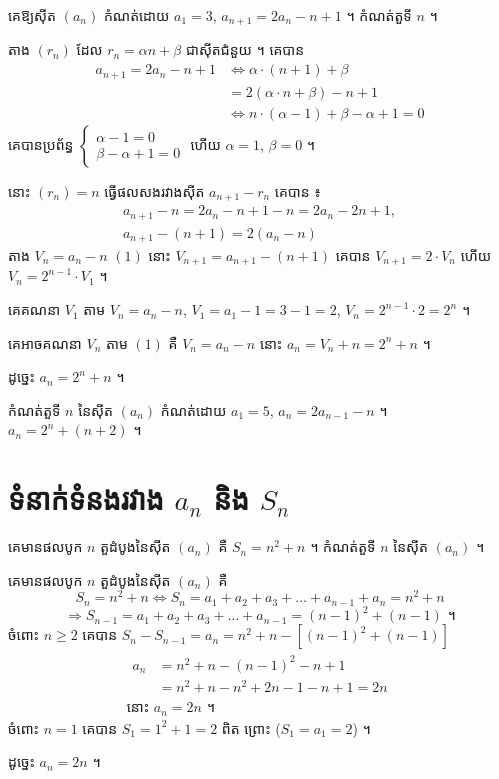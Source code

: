 \begin{example}[លំហាត់គំរូ ២]
គេឱ្យស៊ីត $(a_n)$ កំណត់ដោយ $a_1 = 3$, $a_{n+1} = 2a_n - n + 1$ ។ កំណត់តួទី $n$ ។
\end{example}
\ans
តាង $(r_n)$ ដែល $r_n = \alpha n + \beta$ ជាស៊ីតជំនួយ ។ គេបាន
\[
\begin{aligned}
a_{n+1} = 2a_n - n + 1 &\iff \alpha \cdot (n + 1) + \beta\\
&= 2(\alpha \cdot n + \beta) - n + 1\\
&\iff n \cdot (\alpha - 1) + \beta - \alpha + 1 = 0
\end{aligned}
\]
គេបានប្រព័ន្ធ $\begin{cases} \alpha - 1 = 0\\ \beta - \alpha + 1 = 0 \end{cases}$ ហើយ $\alpha = 1$, $\beta = 0$ ។

នោះ $(r_n) = n$ ធ្វើផលសងរវាងស៊ីត $a_{n+1} - r_n$ គេបាន ៖
\[
\begin{gathered}
a_{n+1} - n = 2a_n - n + 1 - n = 2a_n - 2n + 1,\\
a_{n+1} - (n + 1) = 2(a_n - n)
\end{gathered}
\]
តាង $V_n = a_n - n$ \quad $(1)$ នោះ $V_{n+1} = a_{n+1} - (n + 1)$ គេបាន $V_{n+1} = 2 \cdot V_n$ ហើយ $V_n = 2^{n-1} \cdot V_1$ ។

គេគណនា $V_1$ តាម $V_n = a_n - n$, $V_1 = a_1 - 1 = 3 - 1 = 2$, $V_n = 2^{n-1} \cdot 2 = 2^n$ ។

គេអាចគណនា $V_n$ តាម $(1)$ គឺ $V_n = a_n - n$ នោះ $a_n = V_n + n = 2^n + n$ ។

ដូច្នេះ $a_n = 2^n + n$ ។

\begin{pro}
កំណត់តួទី $n$ នៃស៊ីត $(a_n)$ កំណត់ដោយ $a_1 = 5$, $a_n = 2a_{n-1} - n$ ។
\ans
$a_n = 2^n + (n + 2)$ ។
\end{pro}

\section{ទំនាក់ទំនងរវាង \texorpdfstring{$a_n$}{an} និង \texorpdfstring{$S_n$}{Sn}}

\begin{example}[ឧទាហរណ៍]
គេមានផលបូក $n$ តួដំបូងនៃស៊ីត $(a_n)$ គឺ $S_n = n^2 + n$ ។ កំណត់តួទី $n$ នៃស៊ីត $(a_n)$ ។

គេមានផលបូក $n$ តួដំបូងនៃស៊ីត $(a_n)$ គឺ
\[ S_n = n^2 + n \iff S_n = a_1 + a_2 + a_3 + \ldots + a_{n-1} + a_n = n^2 + n \]
\[ \Rightarrow S_{n-1} = a_1 + a_2 + a_3 + \ldots + a_{n-1} = (n - 1)^2 + (n - 1) \text{ ។} \]
ចំពោះ $n \ge 2$ គេបាន $S_n - S_{n-1} = a_n = n^2 + n - [(n - 1)^2 + (n - 1)]$
\[
\begin{gathered}
\begin{aligned}
a_n &= n^2 + n - (n - 1)^2 - n + 1\\
&= n^2 + n - n^2 + 2n - 1 - n + 1 = 2n
\end{aligned}\\
\text{នោះ } a_n = 2n \text{ ។}
\end{gathered}
\]
ចំពោះ $n = 1$ គេបាន $S_1 = 1^2 + 1 = 2$ ពិត ព្រោះ ($S_1 = a_1 = 2$) ។

ដូច្នេះ $a_n = 2n$ ។
\end{example}

